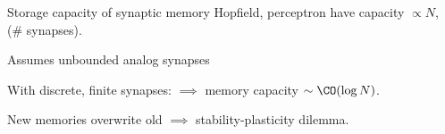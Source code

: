 \documentclass[final]{beamer}%
\begin{document}

\begin{frame}{Storage capacity of synaptic memory}
%
  Hopfield, perceptron have capacity \alert{$\propto N$}, (\# synapses).

\vp\parbox[t]{0.59\linewidth}{%
  Assumes unbounded analog synapses

 \vp With discrete, finite synapses:
 $\implies$ memory capacity  \alert{$\sim\CO(\log N)$}.
 \\ 
 }

 \vp New memories overwrite old
 $\implies$ stability-plasticity dilemma.
%
\end{frame}


\end{document}
